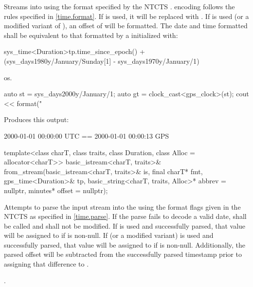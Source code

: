 \begin{itemdescr}
\pnum
\effects Streams  into  using
the format specified by the NTCTS .
 encoding follows the rules specified in \ref{time.format}.
If  is used, it will be replaced with .
If  is used (or a modified variant of ),
an offset of  will be formatted.
The date and time formatted
shall be equivalent to that formatted by a  initialized with:
\begin{codeblock}
sys_time<Duration>{tp.time_since_epoch()} +
  (sys_days{1980y/January/Sunday[1]} - sys_days{1970y/January/1})
\end{codeblock}

\pnum
\returns os.

\pnum
\begin{example}
\begin{codeblock}
auto st = sys_days{2000y/January/1};
auto gt = clock_cast<gps_clock>(st);
cout << format("%
\end{codeblock}

Produces this output:

\begin{codeblock}
2000-01-01 00:00:00 UTC == 2000-01-01 00:00:13 GPS
\end{codeblock}
\end{example}
\end{itemdescr}

%
\begin{itemdecl}
template<class charT, class traits, class Duration, class Alloc = allocator<charT>>
  basic_istream<charT, traits>&
    from_stream(basic_istream<charT, traits>& is, final charT* fmt,
                gps_time<Duration>& tp, basic_string<charT, traits, Alloc>* abbrev = nullptr,
                minutes* offset = nullptr);
\end{itemdecl}

\begin{itemdescr}
\pnum
\effects
Attempts to parse the input stream 
into the   using
the format flags given in the NTCTS 
as specified in \ref{time.parse}.
If the parse fails to decode a valid date,
 shall be called
and  shall not be modified.
If  is used and successfully parsed,
that value will be assigned to  if  is non-null.
If  (or a modified variant) is used and successfully parsed,
that value will be assigned to  if  is non-null.
Additionally, the parsed offset will be subtracted from
the successfully parsed timestamp prior to assigning that difference to .

\pnum
\returns {}.
\end{itemdescr}

